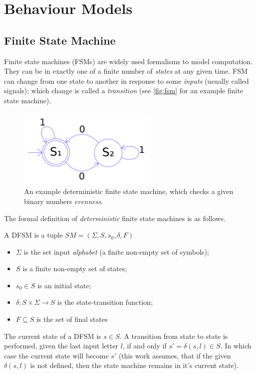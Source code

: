 \section{Behaviour Models}\label{sec:behaviour_models}

\subsection{Finite State Machine}

Finite state machines (FSMs) are widely used formalisms to model computation. They can be in exactly one of a finite number of \emph{states} at any given time. FSM can change from one state to another in response to some \emph{inputs} (usually called signals); which change is called a \emph{transition} (see \autoref{fig:fsm} for an example finite state machine).

\begin{figure}[!ht]
	\centering
	\includegraphics[width=67mm, keepaspectratio]{figures/fsm.png}\hspace{1cm}
	\caption{An example deterministic finite state machine, which checks a given binary numbers \emph{evenness}.}
	\label{fig:fsm}
\end{figure}

The formal definition of \emph{deterministic} finite state machines is as follows.

\begin{definition}
	
	A DFSM is a tuple \( SM = (\Sigma, S, s_0, \delta, F) \)
	
	\begin{itemize}
		\item \(\Sigma\) is the set input \emph{alphabet} (a finite non-empty set of symbols);
		\item \(S\) is a finite non-empty set of states;
		\item \(s_0 \in S\) is an initial state;
		\item \(\delta : S \times \Sigma \rightarrow S \) is the state-transition function;
		\item \(F \subseteq S\) is the set of final states
	\end{itemize}
\end{definition}

The current state of a DFSM is \(s \in S\). A transition from state to state is performed, given the last input letter \(l\), if and only if \( s' = \delta(s, l) \in S \). In which case the current state will become \(s'\) (this work assumes, that if the given \(\delta(s, l)\) is not defined, then the state machine remains in it's current state).
